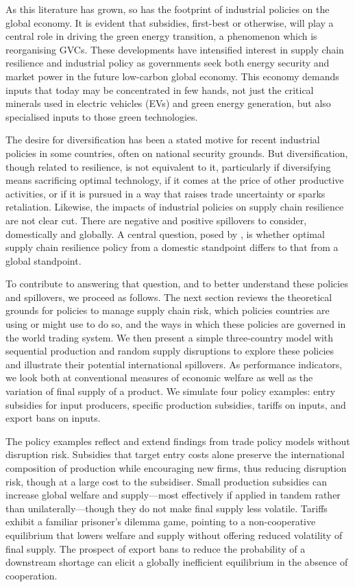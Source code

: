 \documentclass{article}
\begin{document}
As this literature has grown, so has the footprint of industrial policies on the global economy. It is evident that subsidies, first-best or otherwise, will play a central role in driving the green energy transition, a phenomenon which is reorganising GVCs. These developments have intensified interest in supply chain resilience and industrial policy as governments seek both energy security and market power in the future low-carbon global economy. This economy demands inputs that today may be concentrated in few hands, not just the critical minerals used in electric vehicles (EVs) and green energy generation, but also specialised inputs to those green technologies.

The desire for diversification has been a stated motive for recent industrial policies in some countries, often on national security grounds. But diversification, though related to resilience, is not equivalent to it, particularly if diversifying means sacrificing optimal technology, if it comes at the price of other productive activities, or if it is pursued in a way that raises trade uncertainty or sparks retaliation. Likewise, the impacts of industrial policies on supply chain resilience are not clear cut. There are negative and positive spillovers to consider, domestically and globally. A central question, posed by \textcite{bown_modern_2024}, is whether optimal supply chain resilience policy from a domestic standpoint differs to that from a global standpoint.

To contribute to answering that question, and to better understand these policies and spillovers, we proceed as follows. The next section reviews the theoretical grounds for policies to manage supply chain risk, which policies countries are using or might use to do so, and the ways in which these policies are governed in the world trading system. We then present a simple three-country model with sequential production and random supply disruptions to explore these policies and illustrate their potential international spillovers. As performance indicators, we look both at conventional measures of economic welfare as well as the variation of final supply of a product. We simulate four policy examples: entry subsidies for input producers, specific production subsidies, tariffs on inputs, and export bans on inputs.

The policy examples reflect and extend findings from trade policy models without disruption risk. Subsidies that target entry costs alone preserve the international composition of production while encouraging new firms, thus reducing disruption risk, though at a large cost to the subsidiser. Small production subsidies can increase global welfare and supply---most effectively if applied in tandem rather than unilaterally---though they do not make final supply less volatile. Tariffs exhibit a familiar prisoner's dilemma game, pointing to a non-cooperative equilibrium that lowers welfare and supply without offering reduced volatility of final supply. The prospect of export bans to reduce the probability of a downstream shortage can elicit a globally inefficient equilibrium in the absence of cooperation.
\end{document}
